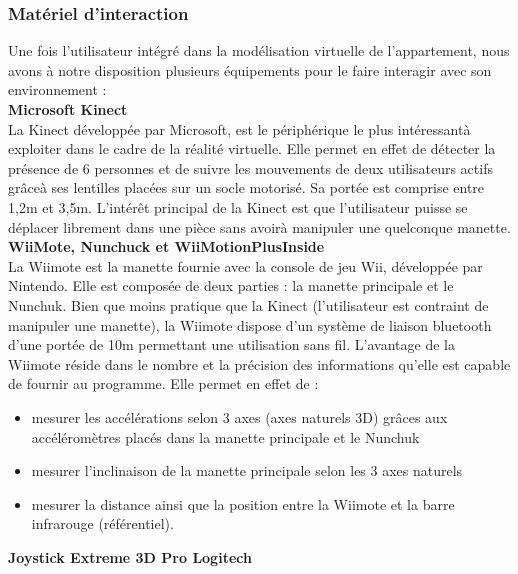 \subsubsection{Mat\'eriel d'interaction}
Une fois l'utilisateur int\'egr\'e dans la mod\'elisation virtuelle de l'appartement, nous avons \`a notre disposition plusieurs \'equipements pour le faire interagir avec son environnement :
\\

\textbf{Microsoft Kinect}
\\

La Kinect d\'evelopp\'ee par Microsoft, est le p\'eriph\'erique le plus int\'eressant\`a exploiter dans le cadre de la r\'ealit\'e virtuelle. Elle permet en effet de d\'etecter la pr\'esence de 6 personnes et de suivre les mouvements de deux utilisateurs actifs gr\^ace\`a ses lentilles plac\'ees sur un socle motoris\'e. Sa port\'ee est comprise entre 1,2m et 3,5m. L'int\'er\^et principal de la Kinect est que l'utilisateur puisse se d\'eplacer librement dans une pi\`ece sans avoir\`a manipuler une quelconque manette.
\\

\textbf{WiiMote, Nunchuck et WiiMotionPlusInside}
\\

La Wiimote est la manette fournie avec la console de jeu Wii, d\'evelopp\'ee par Nintendo. Elle est compos\'ee de deux parties : la manette principale et le Nunchuk. Bien que moins pratique que la Kinect (l'utilisateur est contraint de manipuler une manette), la Wiimote dispose d'un syst\`eme de liaison bluetooth d'une port\'ee de 10m permettant une utilisation sans fil. L'avantage de la Wiimote r\'eside dans le nombre et la pr\'ecision des informations qu'elle est capable de fournir au programme. 
\newline
Elle permet en effet de :
\begin{itemize}
  \item mesurer les acc\'el\'erations selon 3 axes (axes naturels 3D) gr\^aces aux acc\'el\'erom\`etres plac\'es dans la manette principale et le Nunchuk
  \item mesurer l'inclinaison de la manette principale selon les 3 axes naturels
  \item mesurer la distance ainsi que la position entre la Wiimote et la barre infrarouge (r\'ef\'erentiel).
\end{itemize}

\textbf{Joystick Extreme 3D Pro Logitech}
\\


